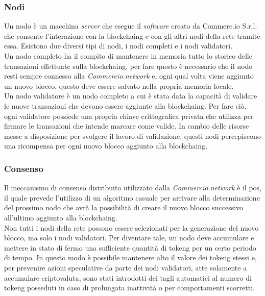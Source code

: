\subsubsection*{Nodi}

Un nodo è un macchina \textit{server} che esegue il \textit{software} creato da Commerc.io S.r.l. che consente l'interazione con la \gls{blockchaing} e con gli altri nodi della rete tramite essa. Esistono due diversi tipi di nodi, i nodi completi e i nodi validatori.\\
Un nodo completo ha il compito di mantenere in memoria tutto lo storico delle transazioni effettuate sulla \gls{blockchaing}, per fare questo è necessario che il nodo resti sempre connesso alla \textit{Commercio.network} e, ogni qual volta viene aggiunto un nuovo blocco, questo deve essere salvato nella propria memoria locale.\\
Un nodo validatore è un nodo completo a cui è stata data la capacità di validare le nuove transazioni che devono essere aggiunte alla \gls{blockchaing}. Per fare ciò, ogni validatore possiede una propria chiave crittografica privata che utilizza per firmare le transazioni che intende marcare come valide. In cambio delle risorse messe a disposizione per svolgere il lavoro di validazione, questi nodi percepiscono una ricompensa per ogni nuovo blocco aggiunto alla \gls{blockchaing}.

\subsubsection*{Consenso}

Il meccanismo di consenso distribuito utilizzato dalla \textit{Commercio.network} è il \gls{pos}, il quale prevede l'utilizzo di un algoritmo casuale per arrivare alla determinazione del prossimo nodo che avrà la possibilità di creare il nuovo blocco successivo all'ultimo aggiunto alla \gls{blockchaing}.\\
Non tutti i nodi della rete possono essere selezionati per la generazione del nuovo blocco, ma solo i nodi validatori. Per diventare tale, un nodo deve accumulare e mettere in stato di fermo una sufficiente quantità di \gls{tokeng} per un certo periodo di tempo. In questo modo è possibile mantenere alto il valore dei \gls{tokeng} stessi e, per prevenire azioni speculative da parte dei nodi validatori, atte solamente a accumulare criptovaluta, sono stati introdotti dei tagli automatici al numero di \gls{tokeng} posseduti in caso di prolungata inattività o per comportamenti scorretti.

